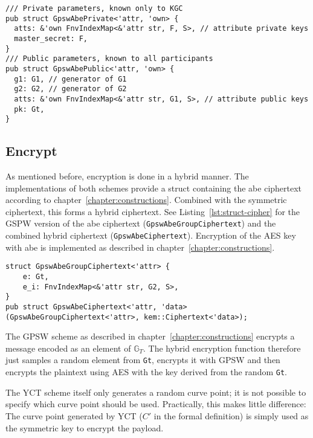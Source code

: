 \begin{lstlisting}[float=h,caption={Private and public system parameters structs for GPSW},label={lst:struct-pubkey}]
/// Private parameters, known only to KGC
pub struct GpswAbePrivate<'attr, 'own> {
  atts: &'own FnvIndexMap<&'attr str, F, S>, // attribute private keys
  master_secret: F,
}
/// Public parameters, known to all participants
pub struct GpswAbePublic<'attr, 'own> {
  g1: G1, // generator of G1
  g2: G2, // generator of G2
  atts: &'own FnvIndexMap<&'attr str, G1, S>, // attribute public keys
  pk: Gt,
}
\end{lstlisting}

\subsection{Encrypt}
As mentioned before, encryption is done in a hybrid manner.
The implementations of both schemes provide a struct containing the \acrshort{abe} ciphertext according to chapter~\ref{chapter:constructions}.
Combined with the symmetric ciphertext, this forms a hybrid ciphertext.
See Listing~\ref{lst:struct-cipher} for the GSPW version of the \acrshort{abe} ciphertext (\verb+GpswAbeGroupCiphertext+) and the combined hybrid ciphertext (\verb+GpswAbeCiphertext+).
Encryption of the AES key with \acrshort{abe} is implemented as described in chapter~\ref{chapter:constructions}.

\begin{lstlisting}[float=h,caption={ABE ciphertext structure for GPSW},label={lst:struct-cipher}, breaklines=true]
struct GpswAbeGroupCiphertext<'attr> {
    e: Gt, 
    e_i: FnvIndexMap<&'attr str, G2, S>,
}
pub struct GpswAbeCiphertext<'attr, 'data>(GpswAbeGroupCiphertext<'attr>, kem::Ciphertext<'data>);
\end{lstlisting}
The GPSW scheme as described in chapter~\ref{chapter:constructions} encrypts a message encoded as an element of $\mathbb{G}_T$.
The hybrid encryption function therefore just samples a random element from \texttt{Gt}, encrypts it with GPSW and then encrypts the plaintext using AES with the key derived from the random \texttt{Gt}.

The YCT scheme itself only generates a random curve point; it is not possible to specify which curve point should be used.
Practically, this makes little difference:
The curve point generated by YCT ($C'$ in the formal definition) is simply used as the symmetric key to encrypt the payload.
  

